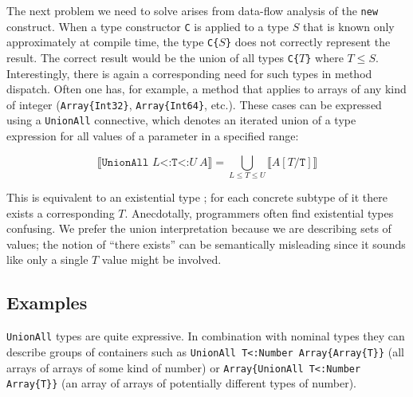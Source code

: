 The next problem we need to solve arises from data-flow analysis of
the \texttt{new} construct.
When a type constructor \texttt{C} is applied to a type
$S$ that is known only approximately at compile time, the type \texttt{C\{}$S$\texttt{\}}
does not correctly represent the result.
The correct result would be the union of all types \texttt{C\{}$T$\texttt{\}}
where $T\leq S$.
Interestingly, there is again a corresponding need for such types in method
dispatch. Often one has, for example, a method that applies to arrays of any
kind of integer (\texttt{Array\{Int32\}}, \texttt{Array\{Int64\}}, etc.).
These cases can be expressed using a \texttt{UnionAll} connective, which denotes
an iterated union of a type expression for all values of a parameter in a specified
range:

\vspace{-3ex}
\[
  \llbracket \texttt{UnionAll }L\texttt{<:T<:}U\ A \rrbracket = \bigcup_{L \leq T \leq U} \llbracket A[T/\texttt{T}] \rrbracket
\]


This is equivalent to an existential type \cite{boundedquant};
for each concrete subtype of it there exists a corresponding $T$.
Anecdotally, programmers often find existential types confusing.
We prefer the union interpretation because we are describing sets of values;
the notion of ``there exists'' can be semantically misleading since it sounds like
only a single $T$ value might be involved.



\subsection{Examples}

\texttt{UnionAll} types are quite expressive. In combination with nominal
types they can describe groups of containers such as
\texttt{UnionAll T<:Number Array\{Array\{T\}\}} (all arrays of arrays of
some kind of number) or
\texttt{Array\{UnionAll T<:Number Array\{T\}\}} (an array of arrays of
potentially different types of number).

